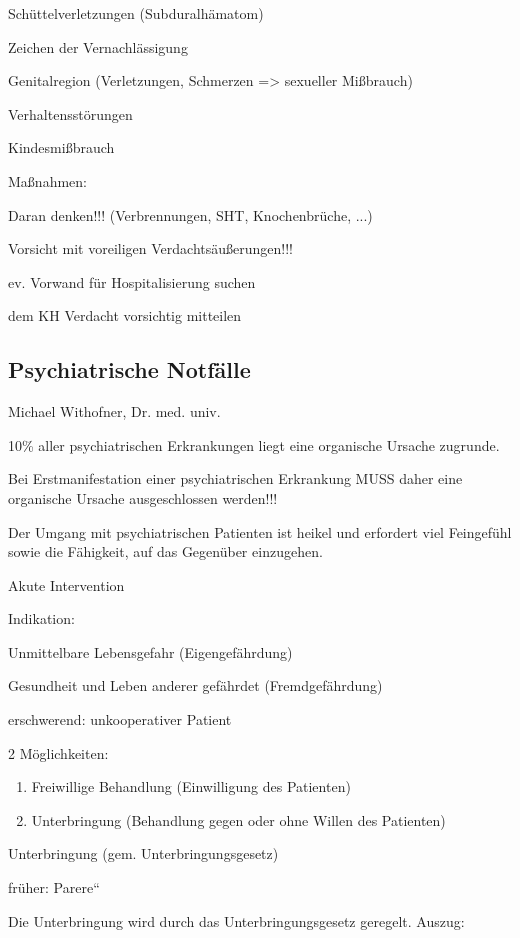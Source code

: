 \documentclass{article}
\begin{document}
Sch\"uttelverletzungen (Subduralh\"amatom)

Zeichen der Vernachl\"assigung

Genitalregion (Verletzungen, Schmerzen ={\textgreater}  sexueller
Mi{\ss}brauch)

Verhaltensst\"orungen

Kindesmi{\ss}brauch

Ma{\ss}nahmen:

Daran denken!!! (Verbrennungen, SHT,  Knochenbr\"uche, ...)

Vorsicht mit voreiligen  Verdachts\"au{\ss}erungen!!!

ev. Vorwand f\"ur Hospitalisierung suchen

dem KH Verdacht vorsichtig mitteilen

\subsection{Psychiatrische Notf\"alle}
Michael Withofner, Dr. med. univ.

10\% aller psychiatrischen Erkrankungen  liegt eine organische Ursache
zugrunde.

Bei Erstmanifestation einer  psychiatrischen Erkrankung MUSS  daher eine
organische Ursache  ausgeschlossen werden!!!

Der Umgang mit psychiatrischen Patienten ist heikel und erfordert viel
Feingef\"uhl sowie die F\"ahigkeit, auf das Gegen\"uber einzugehen. 

Akute Intervention

Indikation:

Unmittelbare Lebensgefahr (Eigengef\"ahrdung)

Gesundheit und Leben anderer gef\"ahrdet (Fremdgef\"ahrdung)

erschwerend: unkooperativer Patient

2 M\"oglichkeiten:

\begin{enumerate}
\item Freiwillige Behandlung (Einwilligung des Patienten)

\item Unterbringung (Behandlung gegen oder ohne Willen des Patienten)

\end{enumerate}
Unterbringung (gem. Unterbringungsgesetz) 

fr\"uher: {\quotedblbase}Parere{\textquotedblleft}

Die Unterbringung wird durch das
Unterbringungsgesetz geregelt. Auszug:
\end{document}
